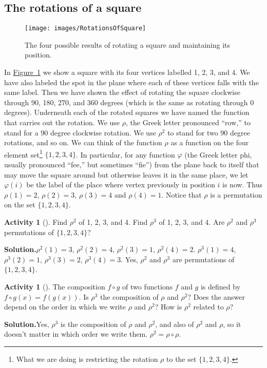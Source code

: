 \documentclass[10pt,]{book}
\theoremstyle{plain}
\theoremstyle{definition}
\newtheorem{activity}[project]{Activity}
\numberwithin{equation}{chapter}
\begin{document}
\subsection[{The rotations of a square}]{The rotations of a square}\label{subsection-58}
\leavevmode%
\begin{figure}
\centering
\texttt{[image: images/RotationsOfSquare]}
\caption{The four possible results of rotating a square and maintaining its position.\label{RotationsOfSquare}}
\end{figure}
In \hyperref[RotationsOfSquare]{Figure~\ref{RotationsOfSquare}} we show a square with its four vertices labelled 1, 2, 3, and 4. We have also labeled the spot in the plane where each of these vertices falls with the same label. Then we have shown the effect of rotating the square clockwise through 90, 180, 270, and 360 degrees (which is the same as rotating through 0 degrees). Underneath each of the rotated squares we have named the function that carries out the rotation. We use \(\rho\), the Greek letter pronounced ``row,'' to stand for a 90 degree clockwise rotation. We use \(\rho^2\) to stand for two 90 degree rotations, and so on. We can think of the function \(\rho\) as a function on the four element set\footnote{What we are doing is restricting the rotation \(\rho\) to the set \(\{1,2,3,4\}\).\label{fn-17}} \(\{1,2,3,4\}\). In particular, for any function \(\varphi\) (the Greek letter phi, usually pronounced ``fee,'' but sometimes ``fie'') from the plane back to itself that may move the square around but otherwise leaves it in the same place, we let \(\varphi(i)\) be the label of the place where vertex previously in position \(i\) is now. Thus \(\rho(1) =2\), \(\rho(2)=3\), \(\rho(3)=4\) and \(\rho(4) =1\). Notice that \(\rho\) is a permutation on the set \(\{1,2,3,4\}\).%
\begin{activity}[]\label{activity-248}
Find \(\rho^2\) of 1, 2, 3, and 4. Find \(\rho^3\) of 1, 2, 3, and 4. Are \(\rho^2\) and \(\rho^3\) permutations of \(\{1,2,3,4\}\)?%
\par\medskip\noindent%
\textbf{Solution.}\quad \(\rho^2(1)=3\), \(\rho^2(2)=4\), \(\rho^2(3)=1\), \(\rho^2(4) =2\). \(\rho^3(1)=4\), \(\rho^3(2)=1\), \(\rho^3(3)=2\), \(\rho^3(4)=3\). Yes, \(\rho^2\) and \(\rho^3\) are permutations of \(\{1,2,3,4\}\).%
\end{activity}
\begin{activity}[]\label{composition1}
The composition \(f\circ g\) of two functions \(f\) and \(g\) is defined by \(f\circ g(x) = f(g(x))\). Is \(\rho^3\) the composition of \(\rho\) and \(\rho^2\)? Does the answer depend on the order in which we write \(\rho\) and \(\rho^2\)? How is \(\rho^2\) related to \(\rho\)?%
\par\medskip\noindent%
\textbf{Solution.}\quad Yes, \(\rho^3\) is the composition of \(\rho\) and \(\rho^2\), and also of \(\rho^2\) and \(\rho\), so it doesn't matter in which order we write them. \(\rho^2=\rho\circ\rho\).%
\end{activity}
\end{document}
